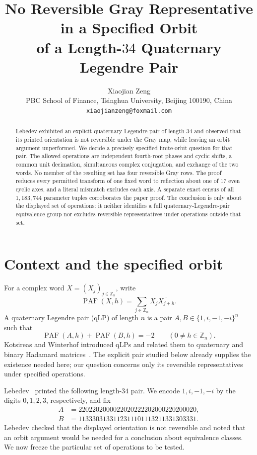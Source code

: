 \documentclass[11pt]{article}
\title{No Reversible Gray Representative in a Specified Orbit\\
of a Length-$34$ Quaternary Legendre Pair}
\author{Xiaojian Zeng\\
PBC School of Finance, Tsinghua University, Beijing 100190, China\\
\texttt{xiaojianzeng@foxmail.com}}
\date{}
\newcommand{\Z}{\mathbb Z}
\newcommand{\PAF}{\operatorname{PAF}}
\begin{document}
\maketitle

\begin{abstract}
Lebedev exhibited an explicit quaternary Legendre pair of length $34$ and
observed that its printed orientation is not reversible under the Gray map,
while leaving an orbit argument unperformed.  We decide a precisely specified
finite-orbit question for that pair.  The allowed operations are independent
fourth-root phases and cyclic shifts, a common unit decimation, simultaneous
complex conjugation, and exchange of the two words.  No member of the resulting
set has four reversible Gray rows.  The proof reduces every permitted transform
of one fixed word to reflection about one of $17$ even cyclic axes, and a
literal mismatch excludes each axis.  A separate exact census of all
$1{,}183{,}744$ parameter tuples corroborates the paper proof.  The conclusion
is only about the displayed set of operations: it neither identifies a full
quaternary-Legendre-pair equivalence group nor excludes reversible
representatives under operations outside that set.
\end{abstract}

\section{Context and the specified orbit}

For a complex word $X=(X_j)_{j\in\Z_n}$, write
\[
  \PAF(X,h)=\sum_{j\in\Z_n}X_j\overline{X_{j+h}}.
\]
A quaternary Legendre pair (qLP) of length $n$ is a pair
$A,B\in\{1,i,-1,-i\}^n$ such that
\[
  \PAF(A,h)+\PAF(B,h)=-2\qquad(0\ne h\in\Z_n).
  \tag{1}
\]
Kotsireas and Winterhof introduced qLPs and related them to quaternary and
binary Hadamard matrices~\cite{KotsireasWinterhof2024}.  The explicit pair
studied below already supplies the existence needed here; our question concerns
only its reversible representatives under specified operations.

Lebedev~\cite{Lebedev2026} printed the following length-$34$ pair.  We encode
$1,i,-1,-i$ by the digits $0,1,2,3$, respectively, and fix
\[
\begin{split}
 A&=2202202000022020222202000220200020,\\
 B&=1133303133112311101113211331303331.
\end{split}
\tag{2}
\]
Lebedev checked that the displayed orientation is not reversible and noted
that an orbit argument would be needed for a conclusion about equivalence
classes.  We now freeze the particular set of operations to be tested.
\end{document}
